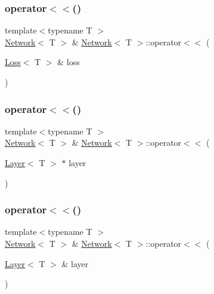 \mbox{\label{class_network_aa31b66b394dd1221a8c090dc21a87de8}} 
\subsubsection{\texorpdfstring{operator$<$$<$()}{operator<<()}\hspace{0.1cm}{\footnotesize\ttfamily [1/4]}}
{\footnotesize\ttfamily template$<$typename T $>$ \\
\mbox{\hyperlink{class_network}{Network}}$<$ T $>$ \& \mbox{\hyperlink{class_network}{Network}}$<$ T $>$\+::operator$<$$<$ (\begin{DoxyParamCaption}\item[{\mbox{\hyperlink{class_loss}{Loss}}$<$ T $>$ \&}]{loss }\end{DoxyParamCaption})}

\mbox{\label{class_network_a692179465a98c66b8797dfe880e9b283}} 
\subsubsection{\texorpdfstring{operator$<$$<$()}{operator<<()}\hspace{0.1cm}{\footnotesize\ttfamily [2/4]}}
{\footnotesize\ttfamily template$<$typename T $>$ \\
\mbox{\hyperlink{class_network}{Network}}$<$ T $>$ \& \mbox{\hyperlink{class_network}{Network}}$<$ T $>$\+::operator$<$$<$ (\begin{DoxyParamCaption}\item[{\mbox{\hyperlink{class_layer}{Layer}}$<$ T $>$ $\ast$}]{layer }\end{DoxyParamCaption})}

\mbox{\label{class_network_ad7c9d63ed466e31bf9a51fa4f3e23d7b}} 
\subsubsection{\texorpdfstring{operator$<$$<$()}{operator<<()}\hspace{0.1cm}{\footnotesize\ttfamily [3/4]}}
{\footnotesize\ttfamily template$<$typename T $>$ \\
\mbox{\hyperlink{class_network}{Network}}$<$ T $>$ \& \mbox{\hyperlink{class_network}{Network}}$<$ T $>$\+::operator$<$$<$ (\begin{DoxyParamCaption}\item[{\mbox{\hyperlink{class_layer}{Layer}}$<$ T $>$ \&}]{layer }\end{DoxyParamCaption})}

